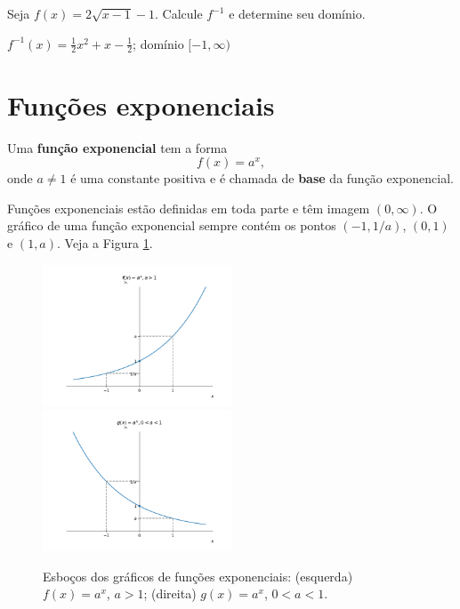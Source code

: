 \begin{exer}
  Seja $f(x) = 2\sqrt{x-1}-1$. Calcule $f^{-1}$ e determine seu domínio.
\end{exer}
\begin{resp}
  $f^{-1}(x) = \frac{1}{2}x^2 + x - \frac{1}{2}$; domínio $[-1, \infty)$
\end{resp}

\section{Funções exponenciais}\label{cap_funcao_sec_funexp}

Uma {\bf função exponencial} tem a forma
\begin{equation}
  f(x) = a^x,
\end{equation}
onde $a\neq 1$ é uma constante positiva e é chamada de {\bf base} da função exponencial.

Funções exponenciais estão definidas em toda parte e têm imagem $(0, \infty)$. O gráfico de uma função exponencial sempre contém os pontos $(-1,1/a)$, $(0,1)$ e $(1,a)$. Veja a Figura \ref{fig:exponencial_graficos}.

\begin{figure}[H]
  \centering
  \includegraphics[width=0.5\textwidth]{./cap_funcao/dados/fig_exponencial_graficos/fig_exponencial_2}~
  \includegraphics[width=0.5\textwidth]{./cap_funcao/dados/fig_exponencial_graficos/fig_exponencial_12}
  \caption{Esboços dos gráficos de funções exponenciais: (esquerda) $f(x) = a^x$, $a>1$; (direita) $g(x) = a^x$, $0<a<1$.}
  \label{fig:exponencial_graficos}
\end{figure}

